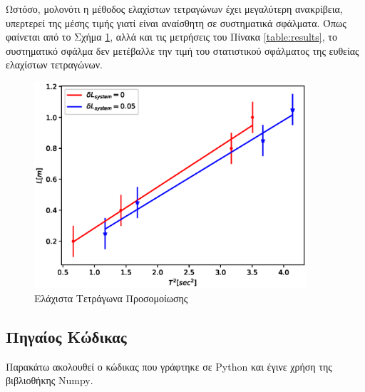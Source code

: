 \documentclass[assignment1.tex]{subfiles}
\begin{document}
Ωστόσο, μολονότι η μέθοδος ελαχίστων τετραγώνων έχει μεγαλύτερη ανακρίβεια, υπερτερεί της μέσης τιμής γιατί είναι αναίσθητη σε συστηματικά σφάλματα. Όπως φαίνεται από το Σχήμα \ref{fig:least_squares}, αλλά και τις μετρήσεις του Πίνακα \ref{table:results}, το συστηματικό σφάλμα δεν μετέβαλλε την τιμή του στατιστικού σφάλματος της ευθείας ελαχίστων τετραγώνων.

\begin{figure}[hp]
\includegraphics[width=0.9\textwidth]{experiment.eps}
\centering
\caption{Ελάχιστα Τετράγωνα Προσομοίωσης}
\label{fig:least_squares}
\end{figure} 

\FloatBarrier

\subsection*{Πηγαίος Κώδικας}

Παρακάτω ακολουθεί ο κώδικας που γράφτηκε σε \textlatin{Python} και έγινε χρήση της βιβλιοθήκης \textlatin{Numpy}.


\end{document}
